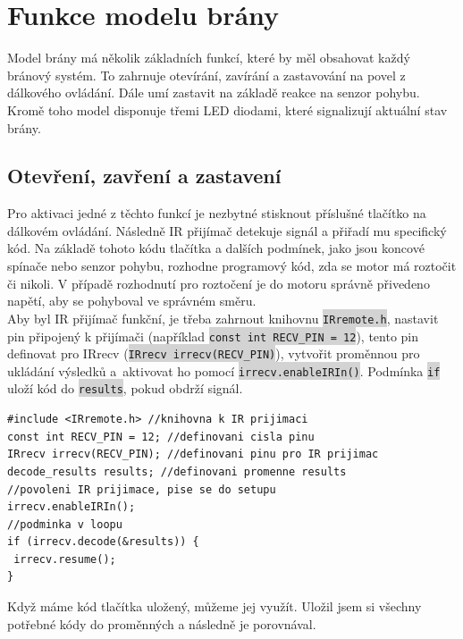 \documentclass[12pt, a4paper, twoside]{report}
\newcommand{\code}[1]{\colorbox{lightgray}{\texttt{#1}}}
\begin{document}

	\chapter{Funkce modelu brány}
	
	\noindent Model brány má několik základních funkcí, které by měl obsahovat každý bránový systém. To zahrnuje otevírání, zavírání a zastavování na povel z dálkového ovládání. Dále umí zastavit na základě reakce na senzor pohybu. Kromě toho model disponuje třemi LED diodami, které signalizují aktuální stav brány. \\
	
	\section{Otevření, zavření a zastavení}
	
	\noindent Pro aktivaci jedné z těchto funkcí je nezbytné stisknout příslušné tlačítko na dálkovém ovládání. Následně IR přijímač detekuje signál a přiřadí mu specifický kód. Na základě tohoto kódu tlačítka a dalších podmínek, jako jsou koncové spínače nebo senzor pohybu, rozhodne programový kód, zda se motor má roztočit či nikoli. V případě rozhodnutí pro roztočení je do motoru správně přivedeno napětí, aby se pohyboval ve správném směru. \\
	
	\noindent Aby byl IR přijímač funkční, je třeba zahrnout knihovnu \code{IRremote.h}, nastavit pin připojený k přijímači (například \code{const int RECV\_PIN = 12}), tento pin definovat pro IRrecv (\code{IRrecv irrecv(RECV\_PIN)}), vytvořit proměnnou pro ukládání výsledků a~aktivovat ho pomocí \code{irrecv.enableIRIn()}. Podmínka \code{if} uloží kód do \code{results}, pokud obdrží signál. \\
	
	\begin{lstlisting}[style=c++]	
#include <IRremote.h> //knihovna k IR prijimaci
const int RECV_PIN = 12; //definovani cisla pinu
IRrecv irrecv(RECV_PIN); //definovani pinu pro IR prijimac
decode_results results; //definovani promenne results
//povoleni IR prijimace, pise se do setupu
irrecv.enableIRIn(); 	
//podminka v loopu	
if (irrecv.decode(&results)) {
 irrecv.resume();
}		
	\end{lstlisting}

	\noindent Když máme kód tlačítka uložený, můžeme jej využít. Uložil jsem si všechny potřebné kódy do proměnných a následně je porovnával.\\
	
\end{document}
